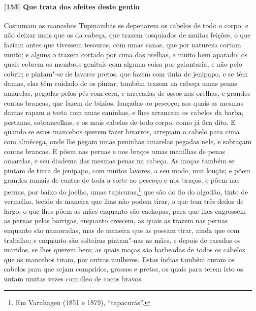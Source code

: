 \begin{linenumbers}
\paragraph{[153] Que trata dos afeites deste gentio}\quad
Costumam os mancebos Tupinambas se depenarem os cabelos de todo o corpo, e não deixar
mais que os da cabeça, que trazem tosquiados de muitas feições, o que faziam antes que
tivessem tesouras, com umas canas, que por natureza cortam muito; e alguns o trazem
cortado por cima das orelhas, e muito bem aparado; os quais cobrem os membros genitais com
alguma coisa por galantaria, e não pelo cobrir; e pintam"-se de lavores pretos, que fazem
com tinta de jenipapo, e se têm damas, elas têm cuidado de os pintar; também trazem na
cabeça umas penas amarelas, pegadas pelos pés com cera, e arrecadas de ossos nas orelhas,
e grandes contas brancas, que fazem de búzios, lançadas ao pescoço; aos quais as mesmas
damas rapam a testa com umas caninhas, e lhes arrancam os cabelos da barba, pestanas,
sobrancelhas, e os mais cabelos de todo corpo, como já fica dito. E quando se estes
mancebos querem fazer bizarros, arrepiam o cabelo para cima com almécega, onde lhe pegam
umas peninhas amarelas pegadas nele, e sobraçam contas brancas. E põem nas pernas e nos
braços umas manilhas de penas amarelas, e seu diadema das mesmas penas na cabeça. As moças
também se pintam de tinta de jenipapo, com muitos lavores, a seu modo, mui louçãs; e põem
grandes ramais de contas de toda a sorte ao pescoço e nos braços; e põem nas pernas, por
baixo do joelho, umas tapicuras,\footnote{ Em Varnhagen (1851 e 1879), ``tapacurás''.} que
são do fio do algodão, tinto de vermelho, tecido de maneira que lhas não podem tirar, o
que tem três dedos de largo; o que lhes põem as mães enquanto são cachopas, para que lhes
engrossem as pernas pelas barrigas, enquanto crescem, as quais as trazem nas pernas
enquanto são namoradas, mas de maneira que as possam tirar, ainda que com trabalho; e
enquanto são solteiras pintam"-nas as mães, e depois de casadas os maridos, se lhes querem
bem; as quais moças são barbeadas de todos os cabelos que os mancebos tiram, por outras
mulheres. Estas índias também curam os cabelos para que sejam compridos, grossos e pretos,
os quais para terem isto os untam muitas vezes com óleo de cocos bravos.


\end{linenumbers}
